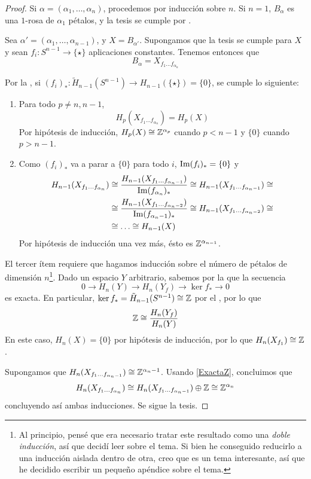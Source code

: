 \begin{proof}
Si $\alpha=(\alpha_1,\dots,\alpha_n)$, procedemos por inducción sobre $n$. Si
$n=1$, $B_\alpha$ es una $1$-rosa de $\alpha_1$ pétalos, y la tesis se cumple
por .

Sea $\alpha'=(\alpha_1,\dots,\alpha_{n-1})$, y $X=B_{\alpha'}$. Supongamos que
la tesis se cumple para $X$ y sean $f_i\colon S^{n-1} \longrightarrow \{\star\}$
aplicaciones constantes. Tenemos entonces que
\[B_\alpha=X_{f_1\dots f_{\alpha_n}}\]

Por la , si $(f_i)_*\colon \tilde H_{n-1}(S^{n-1})\to
H_{n-1}(\{\star\})=\{0\}$, se cumple lo siguiente:
\begin{enumerate}
\item Para todo $p\neq n,n-1$,
\[H_p(X_{f_1\dots f_{\alpha_n}})=H_p(X)\]
Por hipótesis de inducción, $H_p(X)\cong \mathbb{Z}^{\alpha_p}$ cuando $p < n-1$ y
$\{0\}$ cuando $p > n-1$.
\item Como $(f_i)_*$ va a parar a $\{0\}$ para todo $i$, $\operatorname{Im} (f_i)_*=\{0\}$ y
\begin{align*}
H_{n-1}(X_{f_1\dots f_{\alpha_n}})&\cong
	\frac{H_{n-1}(X_{f_1\dots f_{\alpha_n-1}})}{\operatorname{Im} (f_{\alpha_n})_*}\cong
	H_{n-1}(X_{f_1\dots f_{\alpha_n-1}})\cong\\
	&\cong \frac{H_{n-1}(X_{f_1\dots f_{\alpha_n-2}})}{\operatorname{Im} (f_{\alpha_n-1})_*}\cong
	H_{n-1}(X_{f_1\dots f_{\alpha_n-2}})\cong\\
	&\cong \dots \cong H_{n-1}(X)
\end{align*}
Por hipótesis de inducción una vez más, ésto es $\mathbb{Z}^{\alpha_{n-1}}$.
\end{enumerate}

El tercer ítem requiere que hagamos inducción sobre el número de pétalos de
dimensión $n$\footnote{Al principio, pensé que era necesario tratar este
resultado como una \emph{doble inducción}, así que decidí leer sobre el tema.
Si bien he conseguido reducirlo a una inducción aislada dentro de otra, creo
que es un tema interesante, así que he decidido escribir un pequeño apéndice
sobre el tema.}. Dado un espacio $Y$ arbitrario, sabemos por la
 que la secuencia
\[0 \longrightarrow H_n(Y) \longrightarrow H_n(Y_{f})
\longrightarrow \ker f_*\longrightarrow 0\]
es exacta. En particular, $\ker f_*=\tilde H_{n-1}(S^{n-1})\cong \mathbb{Z}$ por el
, por lo que
\begin{equation}
\mathbb{Z}\cong \frac{H_n(Y_f)}{H_n(Y)} \label{ExactaZ}
\end{equation}
En este caso, $H_n(X)=\{0\}$ por hipótesis de inducción, por lo que
$H_n(X_{f_1})\cong \mathbb{Z}$.

Supongamos que $H_n(X_{f_1\dots f_{\alpha_n-1}})\cong \mathbb{Z}^{\alpha_n-1}$.
Usando \eqref{ExactaZ}, concluimos que
\[H_n(X_{f_1\dots f_{\alpha_n}})\cong H_n(X_{f_1\dots f_{\alpha_n-1}})\oplus
\mathbb{Z}\cong \mathbb{Z}^{\alpha_n}\]
concluyendo así ambas inducciones. Se sigue la tesis.
\end{proof}
